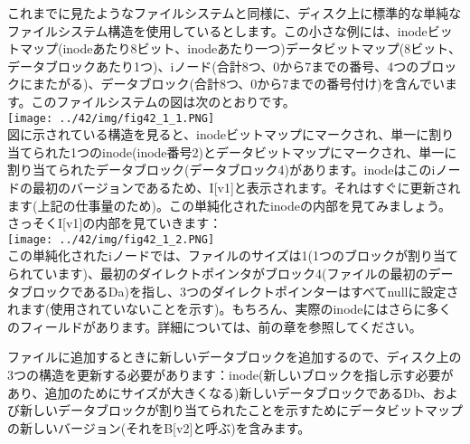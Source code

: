 これまでに見たようなファイルシステムと同様に、ディスク上に標準的な単純なファイルシステム構造を使用しているとします。この小さな例には、inodeビットマップ(inodeあたり8ビット、inodeあたり一つ)データビットマップ(8ビット、データブロックあたり1つ)、iノード(合計8つ、0から7までの番号、4つのブロックにまたがる)、データブロック(合計8つ、0から7までの番号付け)を含んでいます。このファイルシステムの図は次のとおりです。\\
\texttt{[image: ../42/img/fig42\_1\_1.PNG]}\\
図に示されている構造を見ると、inodeビットマップにマークされ、単一に割り当てられた1つのinode(inode番号2)とデータビットマップにマークされ、単一に割り当てられたデータブロック(データブロック4)があります。inodeはこのiノードの最初のバージョンであるため、I{[}v1{]}と表示されます。それはすぐに更新されます(上記の仕事量のため)。この単純化されたinodeの内部を見てみましょう。さっそくI{[}v1{]}の内部を見ていきます：\\
\texttt{[image: ../42/img/fig42\_1\_2.PNG]}\\
この単純化されたiノードでは、ファイルのサイズは1(1つのブロックが割り当てられています)、最初のダイレクトポインタがブロック4(ファイルの最初のデータブロックであるDa)を指し、3つのダイレクトポインターはすべてnullに設定されます(使用されていないことを示す)。もちろん、実際のinodeにはさらに多くのフィールドがあります。詳細については、前の章を参照してください。

ファイルに追加するときに新しいデータブロックを追加するので、ディスク上の3つの構造を更新する必要があります：inode(新しいブロックを指し示す必要があり、追加のためにサイズが大きくなる)新しいデータブロックであるDb、および新しいデータブロックが割り当てられたことを示すためにデータビットマップの新しいバージョン(それをB{[}v2{]}と呼ぶ)を含みます。

